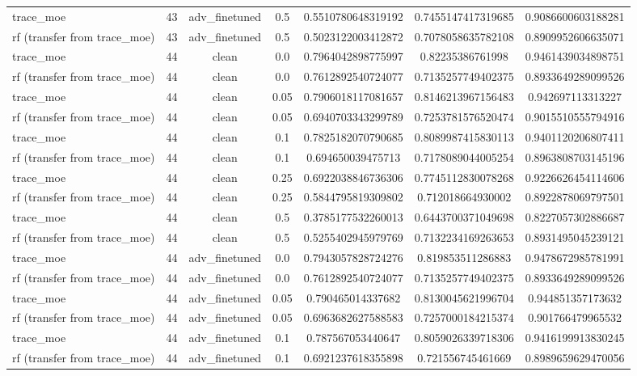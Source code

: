 \begin{table}[htbp]
\begin{tabular}{lcccccc}
trace\_moe & 43 & adv\_finetuned & 0.5 & 0.5510780648319192 & 0.7455147417319685 & 0.9086600603188281 \\
rf (transfer from trace\_moe) & 43 & adv\_finetuned & 0.5 & 0.5023122003412872 & 0.7078058635782108 & 0.8909952606635071 \\
trace\_moe & 44 & clean & 0.0 & 0.7964042898775997 & 0.82235386761998 & 0.9461439034898751 \\
rf (transfer from trace\_moe) & 44 & clean & 0.0 & 0.7612892540724077 & 0.7135257749402375 & 0.8933649289099526 \\
trace\_moe & 44 & clean & 0.05 & 0.7906018117081657 & 0.8146213967156483 & 0.942697113313227 \\
rf (transfer from trace\_moe) & 44 & clean & 0.05 & 0.6940703343299789 & 0.7253781576520474 & 0.9015510555794916 \\
trace\_moe & 44 & clean & 0.1 & 0.7825182070790685 & 0.8089987415830113 & 0.9401120206807411 \\
rf (transfer from trace\_moe) & 44 & clean & 0.1 & 0.694650039475713 & 0.7178089044005254 & 0.8963808703145196 \\
trace\_moe & 44 & clean & 0.25 & 0.6922038846736306 & 0.7745112830078268 & 0.9226626454114606 \\
rf (transfer from trace\_moe) & 44 & clean & 0.25 & 0.5844795819309802 & 0.712018664930002 & 0.8922878069797501 \\
trace\_moe & 44 & clean & 0.5 & 0.3785177532260013 & 0.6443700371049698 & 0.8227057302886687 \\
rf (transfer from trace\_moe) & 44 & clean & 0.5 & 0.5255402945979769 & 0.7132234169263653 & 0.8931495045239121 \\
trace\_moe & 44 & adv\_finetuned & 0.0 & 0.7943057828724276 & 0.819853511286883 & 0.9478672985781991 \\
rf (transfer from trace\_moe) & 44 & adv\_finetuned & 0.0 & 0.7612892540724077 & 0.7135257749402375 & 0.8933649289099526 \\
trace\_moe & 44 & adv\_finetuned & 0.05 & 0.790465014337682 & 0.8130045621996704 & 0.944851357173632 \\
rf (transfer from trace\_moe) & 44 & adv\_finetuned & 0.05 & 0.6963682627588583 & 0.7257000184215374 & 0.901766479965532 \\
trace\_moe & 44 & adv\_finetuned & 0.1 & 0.787567053440647 & 0.8059026339718306 & 0.9416199913830245 \\
rf (transfer from trace\_moe) & 44 & adv\_finetuned & 0.1 & 0.6921237618355898 & 0.721556745461669 & 0.8989659629470056 \\

\end{tabular}
\end{table}
